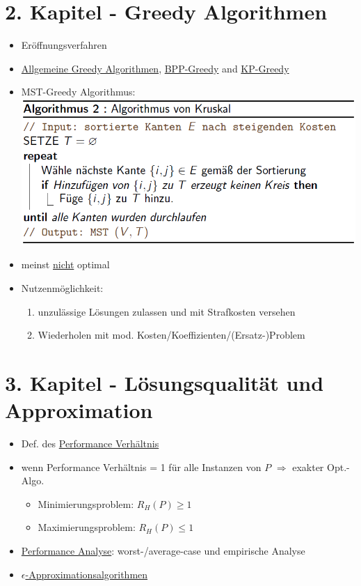 \documentclass[12pt]{article}
\begin{document}
	\section{2. Kapitel - Greedy Algorithmen}
		\begin{itemize}
			\item Eröffnungsverfahren
			\item \hyperref[greedy]{Allgemeine Greedy Algorithmen}, \hyperref[BPGreedy]{BPP-Greedy} and \hyperref[KPGreedy]{KP-Greedy}
			\item MST-Greedy Algorithmus: \\
				\includegraphics[scale=0.6]{KruskalGreedy}
			\item meinst \underline{nicht} optimal
			\item Nutzenmöglichkeit: \begin{enumerate}
					\item unzulässige Lösungen zulassen und mit Strafkosten versehen
					\item Wiederholen mit mod. Kosten/Koeffizienten/(Ersatz-)Problem
				\end{enumerate}
		\end{itemize}
	\section{3. Kapitel - Lösungsqualität und Approximation}
		\begin{itemize}
			\item Def. des \hyperref[Performance Verhaeltnis]{Performance Verhältnis}
			\item wenn Performance Verhältnis = 1 für alle Instanzen von $P$ $\Rightarrow$ exakter Opt.-Algo.
				\begin{itemize}
					\item Minimierungsproblem: $R_H(P) \ge 1$
					\item Maximierungsproblem: $R_H(P) \le 1$
				\end{itemize}
			\item \hyperref[Performance Analyse]{Performance Analyse}: worst-/average-case und empirische Analyse
			\item \hyperref[eApproxAlgo]{$\epsilon$-Approximationsalgorithmen}
		\end{itemize}
\end{document}
